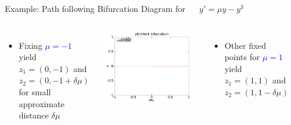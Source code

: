 \documentclass{beamer}
\begin{document}
\begin{frame}{Example: Path following}
    Bifurcation Diagram for ~~ $y' = \mu y - y^3 $
    \begin{columns}
        \begin{itemize}
            \item Fixing \textcolor{blue}{$\mu = -1$} yield $z_{1} = (0, -1)$ and $z_{2} = (0, -1 + \delta \mu)${}
            for small approximate distance $\delta\mu$
            \\
        \end{itemize}
        \pause
        \includegraphics[width=1\textwidth]{grafik/pfexample1}
        \pause
        \begin{itemize}
            \item Other fixed points for \textcolor{blue}{$\mu = 1$} yield $z_{1} = (1, 1)$ and $z_{2} = (1, 1 - \delta \mu)$
            \\
        \end{itemize}
        ~\\
        ~\\
        

\end{columns}
\end{frame}
\end{document}
